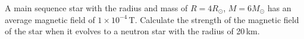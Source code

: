 A main sequence star with the radius and mass of $R = 4R_\odot$,
$M = 6M_\odot$ has an average magnetic field of $1 \times 10^{-4}$\,T.
Calculate the strength of the magnetic field of the star when it evolves to a
neutron star with the radius of 20\,km.
